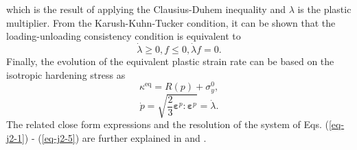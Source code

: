 which is the result of applying the Clausius-Duhem inequality and $ \lambda $ is the plastic multiplier. From the Karush-Kuhn-Tucker condition, it can be shown that the loading-unloading consistency condition is equivalent to 
\begin{equation}\label{eq-j2-4-3}
\dot\lambda\ge0,f\le0,\dot\lambda f=0.
\end{equation}
Finally, the evolution of the equivalent plastic strain rate can be based on the isotropic hardening stress as
\begin{equation}\label{eq-j2-4-4}
\kappa^\text{eq}=R(p)+\sigma_y^0,
\end{equation}
\begin{equation}\label{eq-j2-5}
\dot{p}=\sqrt{\frac{2}{3}\bm\varepsilon^p:\bm\varepsilon^p}=\dot\lambda.
\end{equation}
The related close form expressions and the resolution of the system of Eqs. (\ref{eq-j2-1}) - (\ref{eq-j2-5}) are further explained in \cite{cuitinoMaterialindependantMethodExtending1992} and \cite{nguyenComputationalHomogenizationCellular2014}.


